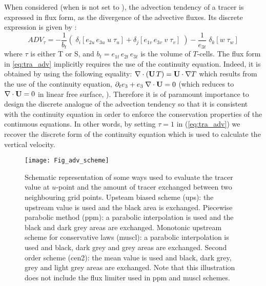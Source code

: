 \documentclass[../main/NEMO_manual]{subfiles}
\begin{document}
When considered (\ie when  is not set to ),
the advection tendency of a tracer is expressed in flux form,
\ie as the divergence of the advective fluxes.
Its discrete expression is given by :
\begin{equation}
  \label{eq:tra_adv}
  ADV_\tau =-\frac{1}{b_t} \left(
    \;\delta_i \left[ e_{2u}\,e_{3u} \;  u\; \tau_u  \right]
    +\delta_j \left[ e_{1v}\,e_{3v}  \;  v\; \tau_v  \right] \; \right)
  -\frac{1}{e_{3t}} \;\delta_k \left[ w\; \tau_w \right]
\end{equation}
where $\tau$ is either T or S, and $b_t= e_{1t}\,e_{2t}\,e_{3t}$ is the volume of $T$-cells.
The flux form in \autoref{eq:tra_adv} implicitly requires the use of the continuity equation.
Indeed, it is obtained by using the following equality:
$\nabla \cdot \left( \mathbf{U}\,T \right)=\mathbf{U} \cdot \nabla T$ which
results from the use of the continuity equation,  $\partial _t e_3 + e_3\;\nabla \cdot \mathbf{U}=0$
(which reduces to $\nabla \cdot \mathbf{U}=0$ in linear free surface, \ie {}).
Therefore it is of paramount importance to design the discrete analogue of the advection tendency so that
it is consistent with the continuity equation in order to enforce the conservation properties of
the continuous equations.
In other words, by setting $\tau = 1$ in (\autoref{eq:tra_adv}) we recover the discrete form of
the continuity equation which is used to calculate the vertical velocity.
\begin{figure}[!t]
  \begin{center}
    \texttt{[image: Fig\_adv\_scheme]}
    \caption{
      \protect\label{fig:adv_scheme}
      Schematic representation of some ways used to evaluate the tracer value at $u$-point and
      the amount of tracer exchanged between two neighbouring grid points.
      Upsteam biased scheme (ups):
      the upstream value is used and the black area is exchanged.
      Piecewise parabolic method (ppm):
      a parabolic interpolation is used and the black and dark grey areas are exchanged.
      Monotonic upstream scheme for conservative laws (muscl):
      a parabolic interpolation is used and black, dark grey and grey areas are exchanged.
      Second order scheme (cen2):
      the mean value is used and black, dark grey, grey and light grey areas are exchanged.
      Note that this illustration does not include the flux limiter used in ppm and muscl schemes.
    }
  \end{center}
\end{figure}
\end{document}
